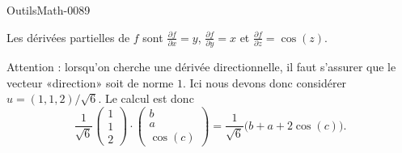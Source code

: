 
\begin{corrige}{OutilsMath-0089}

    Les dérivées partielles de $f$ sont $\frac{ \partial f }{ \partial x }=y$, $\frac{ \partial f }{ \partial y }=x$ et $\frac{ \partial f }{ \partial z }=\cos(z)$.

    Attention : lorsqu'on cherche une dérivée directionnelle, il faut s'assurer que le vecteur «direction» soit de norme $1$. Ici nous devons donc considérer $u=(1,1,2)/\sqrt{6}$. Le calcul est donc
    \begin{equation}
        \frac{1}{ \sqrt{6} }\begin{pmatrix}
            1    \\ 
            1    \\ 
            2    
        \end{pmatrix}\cdot\begin{pmatrix}
            b    \\ 
            a    \\ 
            \cos(c)    
        \end{pmatrix}=\frac{1}{ \sqrt{6} }\big(b+a+2\cos(c)\big).
    \end{equation}

\end{corrige}
